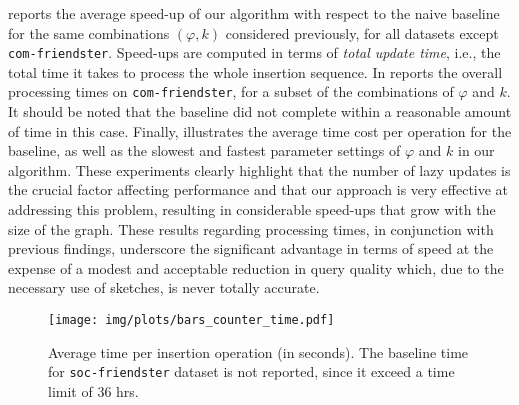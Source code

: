  reports the average speed-up of our algorithm with respect to the naive baseline for the same combinations $(\varphi, k)$ considered previously, for all datasets except \texttt{com-friendster}. Speed-ups are computed in terms of \emph{total update time}, i.e., the total time it takes to process the whole insertion sequence. In  reports the overall processing times on \texttt{com-friendster}, for a subset of the combinations of $\varphi$ and $k$. It should be noted that the baseline did not complete within a reasonable amount of time in this case. Finally,  illustrates the average time cost per operation for the baseline, as well as the slowest and fastest parameter settings of $\varphi$ and $k$ in our algorithm.
These experiments clearly highlight that the number of lazy updates is the crucial factor affecting performance and that our approach is very effective at addressing this problem, resulting in considerable speed-ups that grow with the size of the graph.
These results regarding processing times, in conjunction with previous findings, underscore the significant advantage in terms of speed at the expense of a modest and acceptable reduction in query quality which, due to the necessary use of sketches, is never totally accurate.

\begin{figure}
    \centering
    \texttt{[image: img/plots/bars\_counter\_time.pdf]}
    \caption{Average time per insertion operation (in seconds). The baseline time for \texttt{soc-friendster} dataset is not reported, since it exceed a time limit of $36$ hrs.}
    \label{fig:bar_times}
\end{figure}

